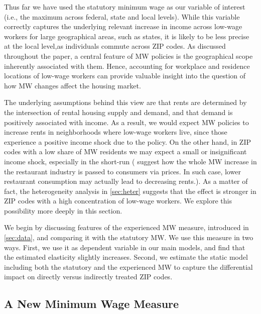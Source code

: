 
Thus far we have used the statutory minimum wage as our variable of interest (i.e., 
the maximum across federal, state and local levels). While this variable correctly 
captures the underlying relevant increase in income across low-wage workers for large
geographical areas, such as states, it is likely to be less precise at the local level,as 
individuals commute across ZIP codes. As discussed throughout the paper, a central feature of MW 
policies is the geographical scope inherently associated with them. Hence, accounting 
for workplace and residence locations of low-wage workers can provide valuable insight 
into the question of how MW changes affect the housing market. 

The underlying assumptions behind this view are that rents are determined by the 
intersection of rental housing supply and demand, and that demand is
positively associated with income. As a result, we would expect MW policies to increase 
rents in neighborhoods where low-wage workers live, since those experience a positive
income shock due to the policy. On the other hand,  in ZIP codes with a low share 
of MW residents we may expect a small or insignificant income shock, especially 
in the short-run (\cite{allegretto2018local} suggest how the whole MW increase in 
the restaurant industry is passed to consumers via prices. In such case, lower 
restaurant consumption may actually lead to decreasing rents.). 
As a matter of fact, the heterogeneity analysis in 
\autoref{sec:heter} suggests that the effect is stronger in ZIP codes with a high
concentration of low-wage workers. We explore this possibility more deeply in this 
section.

We begin by discussing features of the experienced MW measure, 
introduced in \autoref{sec:data}, and comparing it with the statutory MW. 
We use this measure in two ways. First, we use it as dependent variable in our main models, 
and find that the estimated elasticity slightly increases. Second, we estimate the static 
model including both the statutory and the experienced MW to capture the differential 
impact on directly versus indirectly treated ZIP codes. 

\subsection{A New Minimum Wage Measure}

